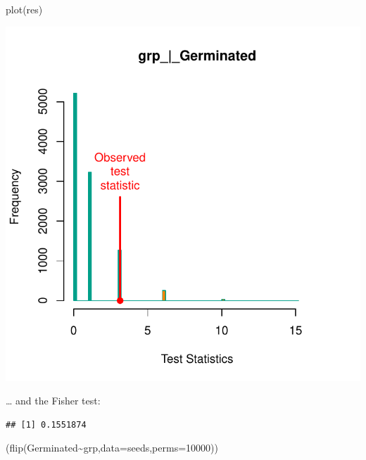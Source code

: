 \documentclass[
]{article}
\newenvironment{Shaded}{\begin{snugshade}}{\end{snugshade}}
\newcommand{\AttributeTok}[1]{\textcolor[rgb]{0.77,0.63,0.00}{#1}}
\newcommand{\DecValTok}[1]{\textcolor[rgb]{0.00,0.00,0.81}{#1}}
\newcommand{\FunctionTok}[1]{\textcolor[rgb]{0.00,0.00,0.00}{#1}}
\newcommand{\NormalTok}[1]{#1}
\newcommand{\SpecialCharTok}[1]{\textcolor[rgb]{0.00,0.00,0.00}{#1}}
\begin{document}
\begin{Shaded}
\begin{Highlighting}[]
\FunctionTok{plot}\NormalTok{(res)}
\end{Highlighting}
\end{Shaded}

\begin{center}\includegraphics{perm_files/figure-latex/unnamed-chunk-27-1} \end{center}

\ldots{} and the Fisher test:

\begin{Shaded}
\end{Shaded}

\begin{verbatim}
## [1] 0.1551874
\end{verbatim}

\begin{Shaded}
\begin{Highlighting}[]
\NormalTok{(}\FunctionTok{flip}\NormalTok{(Germinated}\SpecialCharTok{\textasciitilde{}}\NormalTok{grp,}\AttributeTok{data=}\NormalTok{seeds,}\AttributeTok{perms=}\DecValTok{10000}\NormalTok{))}
\end{Highlighting}
\end{Shaded}
\end{document}
